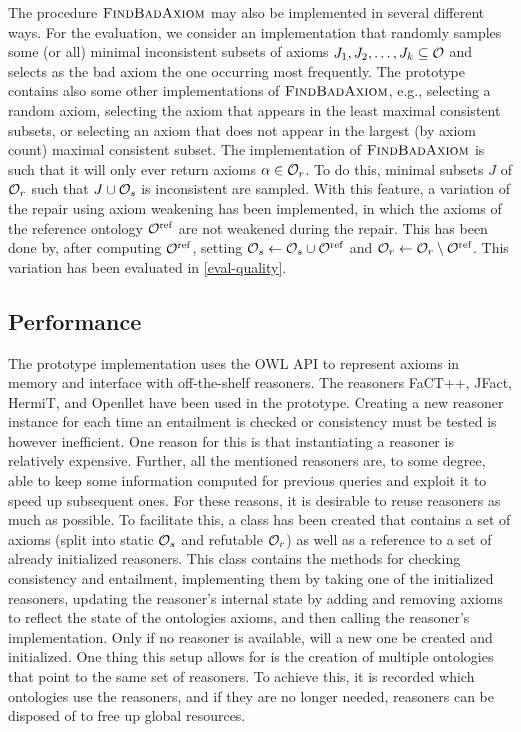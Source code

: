 The procedure $\textsc{FindBadAxiom}$ may also be implemented in several different ways. For the evaluation, we consider an implementation that randomly samples some (or all) minimal inconsistent subsets of axioms $J_1, J_2, \dots, J_k \subseteq \mathcal{O}$ and selects as the bad axiom the one occurring most frequently. The prototype contains also some other implementations of $\textsc{FindBadAxiom}$, e.g., selecting a random axiom, selecting the axiom that appears in the least maximal consistent subsets, or selecting an axiom that does not appear in the largest (by axiom count) maximal consistent subset. The implementation of $\textsc{FindBadAxiom}$ is such that it will only ever return axioms $\alpha \in \mathcal{O}_r$. To do this, minimal subsets $J$ of $\mathcal{O}_r$ such that $J \cup \mathcal{O}_s$ is inconsistent are sampled. With this feature, a variation of the repair using axiom weakening has been implemented, in which the axioms of the reference ontology ${\mathcal{O}^\textnormal{ref}}$ are not weakened during the repair. This has been done by, after computing ${\mathcal{O}^\textnormal{ref}}$, setting $\mathcal{O}_s \gets \mathcal{O}_s \cup {\mathcal{O}^\textnormal{ref}}$ and $\mathcal{O}_r \gets \mathcal{O}_r \setminus {\mathcal{O}^\textnormal{ref}}$. This variation has been evaluated in \cref{eval-quality}.

\subsection{Performance}\label{performance-impl}

The prototype implementation uses the OWL API \cite{horridge2011owl,owlapi} to represent axioms in memory and interface with off-the-shelf reasoners. The reasoners FaCT++, JFact, HermiT, and Openllet have been used in the prototype. Creating a new reasoner instance for each time an entailment is checked or consistency must be tested is however inefficient. One reason for this is that instantiating a reasoner is relatively expensive. Further, all the mentioned reasoners are, to some degree, able to keep some information computed for previous queries and exploit it to speed up subsequent ones. For these reasons, it is desirable to reuse reasoners as much as possible. To facilitate this, a class  has been created that contains a set of axioms (split into static $\mathcal{O}_s$ and refutable $\mathcal{O}_r$) as well as a reference to a set of already initialized reasoners. This class contains the methods for checking consistency and entailment, implementing them by taking one of the initialized reasoners, updating the reasoner's internal state by adding and removing axioms to reflect the state of the ontologies axioms, and then calling the reasoner's implementation. Only if no reasoner is available, will a new one be created and initialized. One thing this setup allows for is the creation of multiple ontologies that point to the same set of reasoners. To achieve this, it is recorded which ontologies use the reasoners, and if they are no longer needed, reasoners can be disposed of to free up global resources.

